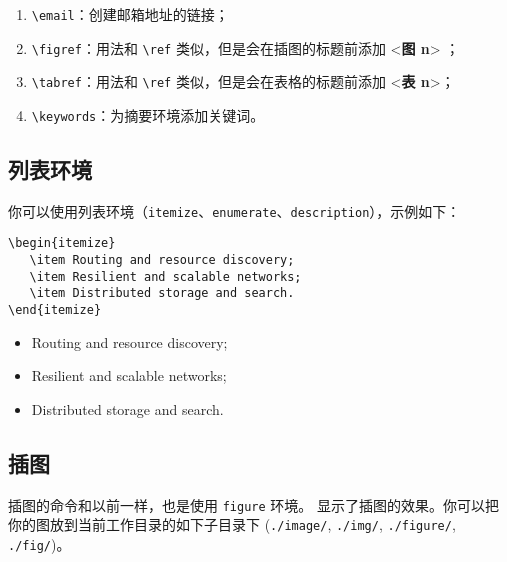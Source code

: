 \documentclass[lang=cn,11pt]{elegantpaper}
\begin{document}
\begin{enumerate}
	\item \lstinline{\email}：创建邮箱地址的链接；
	\item \lstinline{\figref}：用法和 \lstinline{\ref} 类似，但是会在插图的标题前添加 <\textbf{图 n}> ；
	\item \lstinline{\tabref}：用法和 \lstinline{\ref} 类似，但是会在表格的标题前添加 <\textbf{表 n}>；
	\item \lstinline{\keywords}：为摘要环境添加关键词。
\end{enumerate}



\subsection{列表环境}
你可以使用列表环境（\lstinline{itemize}、\lstinline{enumerate}、\lstinline{description}），示例如下：\\[2ex]
\begin{minipage}[c]{0.59\linewidth}
\begin{lstlisting}
\begin{itemize}
   \item Routing and resource discovery;
   \item Resilient and scalable networks; 
   \item Distributed storage and search.
\end{itemize}
\end{lstlisting}
\end{minipage}
\begin{minipage}[c]{0.4\linewidth}
\begin{itemize}
   \item Routing and resource discovery;
   \item Resilient and scalable networks;
   \item Distributed storage and search.
\end{itemize}
\end{minipage}




\subsection{插图}
插图的命令和以前一样，也是使用 \lstinline{figure} 环境。 显示了插图的效果。你可以把你的图放到当前工作目录的如下子目录下 (\lstinline{./image/}, \lstinline{./img/}, \lstinline{./figure/}, \lstinline{./fig/})。
\end{document}
